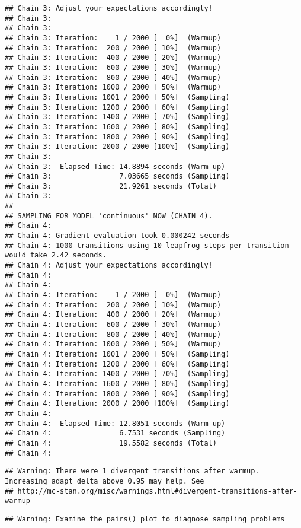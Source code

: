 \documentclass[]{article}
\begin{document}
\begin{verbatim}
## Chain 3: Adjust your expectations accordingly!
## Chain 3: 
## Chain 3: 
## Chain 3: Iteration:    1 / 2000 [  0%]  (Warmup)
## Chain 3: Iteration:  200 / 2000 [ 10%]  (Warmup)
## Chain 3: Iteration:  400 / 2000 [ 20%]  (Warmup)
## Chain 3: Iteration:  600 / 2000 [ 30%]  (Warmup)
## Chain 3: Iteration:  800 / 2000 [ 40%]  (Warmup)
## Chain 3: Iteration: 1000 / 2000 [ 50%]  (Warmup)
## Chain 3: Iteration: 1001 / 2000 [ 50%]  (Sampling)
## Chain 3: Iteration: 1200 / 2000 [ 60%]  (Sampling)
## Chain 3: Iteration: 1400 / 2000 [ 70%]  (Sampling)
## Chain 3: Iteration: 1600 / 2000 [ 80%]  (Sampling)
## Chain 3: Iteration: 1800 / 2000 [ 90%]  (Sampling)
## Chain 3: Iteration: 2000 / 2000 [100%]  (Sampling)
## Chain 3: 
## Chain 3:  Elapsed Time: 14.8894 seconds (Warm-up)
## Chain 3:                7.03665 seconds (Sampling)
## Chain 3:                21.9261 seconds (Total)
## Chain 3: 
## 
## SAMPLING FOR MODEL 'continuous' NOW (CHAIN 4).
## Chain 4: 
## Chain 4: Gradient evaluation took 0.000242 seconds
## Chain 4: 1000 transitions using 10 leapfrog steps per transition would take 2.42 seconds.
## Chain 4: Adjust your expectations accordingly!
## Chain 4: 
## Chain 4: 
## Chain 4: Iteration:    1 / 2000 [  0%]  (Warmup)
## Chain 4: Iteration:  200 / 2000 [ 10%]  (Warmup)
## Chain 4: Iteration:  400 / 2000 [ 20%]  (Warmup)
## Chain 4: Iteration:  600 / 2000 [ 30%]  (Warmup)
## Chain 4: Iteration:  800 / 2000 [ 40%]  (Warmup)
## Chain 4: Iteration: 1000 / 2000 [ 50%]  (Warmup)
## Chain 4: Iteration: 1001 / 2000 [ 50%]  (Sampling)
## Chain 4: Iteration: 1200 / 2000 [ 60%]  (Sampling)
## Chain 4: Iteration: 1400 / 2000 [ 70%]  (Sampling)
## Chain 4: Iteration: 1600 / 2000 [ 80%]  (Sampling)
## Chain 4: Iteration: 1800 / 2000 [ 90%]  (Sampling)
## Chain 4: Iteration: 2000 / 2000 [100%]  (Sampling)
## Chain 4: 
## Chain 4:  Elapsed Time: 12.8051 seconds (Warm-up)
## Chain 4:                6.7531 seconds (Sampling)
## Chain 4:                19.5582 seconds (Total)
## Chain 4:
\end{verbatim}

\begin{verbatim}
## Warning: There were 1 divergent transitions after warmup. Increasing adapt_delta above 0.95 may help. See
## http://mc-stan.org/misc/warnings.html#divergent-transitions-after-warmup
\end{verbatim}

\begin{verbatim}
## Warning: Examine the pairs() plot to diagnose sampling problems
\end{verbatim}
\end{document}

